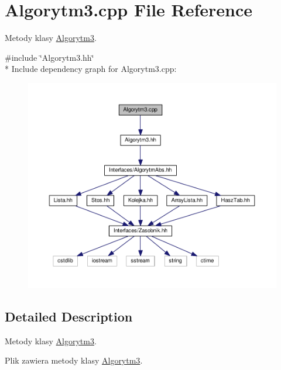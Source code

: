 \hypertarget{a00022}{}\section{Algorytm3.\+cpp File Reference}
\label{a00022}


Metody klasy \hyperlink{a00004}{Algorytm3}.  


{\ttfamily \#include \char`\"{}Algorytm3.\+hh\char`\"{}}\\*
Include dependency graph for Algorytm3.\+cpp\+:
\nopagebreak
\begin{figure}[H]
\begin{center}
\leavevmode
\includegraphics[width=350pt]{a00059}
\end{center}
\end{figure}


\subsection{Detailed Description}
Metody klasy \hyperlink{a00004}{Algorytm3}. 

Plik zawiera metody klasy \hyperlink{a00004}{Algorytm3}. 